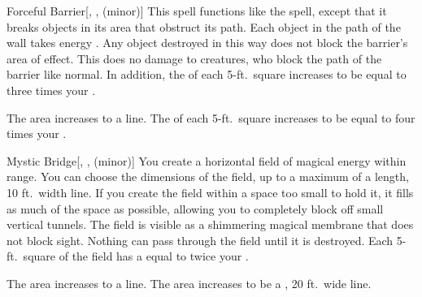 \lowercase{\hypertarget{spell:Forceful Barrier}{}}\label{spell:Forceful Barrier}
\begin{freeability}[Rank 3]{\hypertarget{spell:Forceful Barrier}{Forceful Barrier}}[, ,  (minor)]
\targetrule
This spell functions like the  spell, except that it breaks objects in its area that obstruct its path.
Each object in the path of the wall takes energy .
Any object destroyed in this way does not block the barrier's area of effect.
This does no damage to creatures, who block the path of the barrier like normal.
In addition, the  of each 5-ft.\ square increases to be equal to three times your .

\rankline
{} The area increases to a \arealarge line.
 The  of each 5-ft.\ square increases to be equal to four times your .
\end{freeability}
\vspace{0.25em}



\lowercase{\hypertarget{spell:Mystic Bridge}{}}\label{spell:Mystic Bridge}
\begin{freeability}[Rank 3]{\hypertarget{spell:Mystic Bridge}{Mystic Bridge}}[, ,  (minor)]
\targetrule
You create a horizontal field of magical energy within \rngmed range.
You can choose the dimensions of the field, up to a maximum of a \areamed length, 10 ft.\ width line.
If you create the field within a space too small to hold it, it fills as much of the space as possible, allowing you to completely block off small vertical tunnels.
The field is visible as a shimmering magical membrane that does not block sight.
Nothing can pass through the field until it is destroyed.
Each 5-ft.\ square of the field has a  equal to twice your .

\rankline
{} The area increases to a \arealarge line.
 The area increases to be a \areahuge, 20 ft.\ wide line.
\end{freeability}
\vspace{0.25em}



